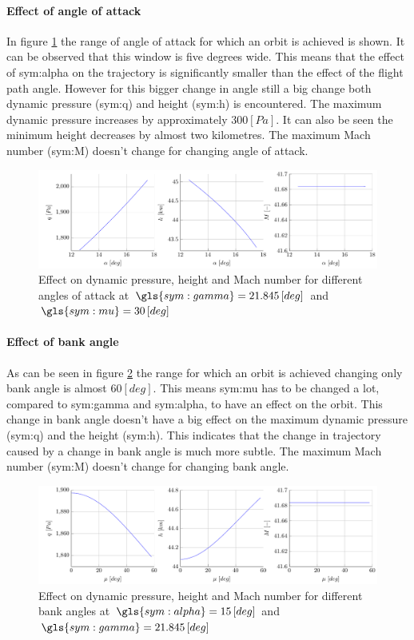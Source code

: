 \paragraph{Effect of angle of attack}

In figure \ref{fig:effectalpha} the range of angle of attack for which an orbit is achieved is shown. It can be observed that this window is five degrees wide. This means that the effect of \gls{sym:alpha} on the trajectory is significantly smaller than the effect of the flight path angle. However for this bigger change in angle still a big change both dynamic pressure (\gls{sym:q}) and height (\gls{sym:h}) is encountered. The maximum dynamic pressure increases by approximately $300 \left[Pa\right]$. It can also be seen the minimum height decreases by almost two kilometres. The maximum Mach number (\gls{sym:M}) doesn't change for changing angle of attack.
\begin{figure}[h]
	\centering
	\includegraphics[width=\textwidth]{./Figure/orbit/effectalpha.pdf}
	\caption{Effect on dynamic pressure, height and Mach number for different angles of attack at $\gls{sym:gamma}=21.845 \left[deg\right]$ and $\gls{sym:mu}=30 \left[deg\right]$}
	\label{fig:effectalpha}
\end{figure}

\paragraph{Effect of bank angle}

As can be seen in figure \ref{fig:effectmu} the range for which an orbit is achieved changing only bank angle is almost $60 \left[deg\right]$. This means \gls{sym:mu} has to be changed a lot, compared to \gls{sym:gamma} and \gls{sym:alpha}, to have an effect on the orbit. This change in bank angle doesn't have a big effect on the maximum dynamic pressure (\gls{sym:q}) and the height (\gls{sym:h}). This indicates that the change in trajectory caused by a change in bank angle is much more subtle. The maximum Mach number (\gls{sym:M}) doesn't change for changing bank angle.
\begin{figure}[h]
	\centering
	\includegraphics[width=\textwidth]{./Figure/orbit/effectmu.pdf}
	\caption{Effect on dynamic pressure, height and Mach number for different bank angles at $\gls{sym:alpha}=15 \left[deg\right]$ and $\gls{sym:gamma}=21.845 \left[deg\right]$}
	\label{fig:effectmu}
\end{figure}


